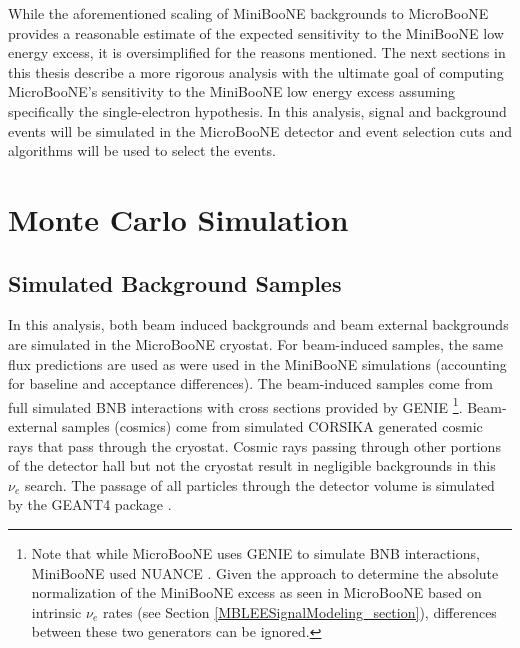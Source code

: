 While the aforementioned scaling of MiniBooNE backgrounds to MicroBooNE provides a reasonable estimate of the expected sensitivity to the MiniBooNE low energy excess, it is oversimplified for the reasons mentioned. The next sections in this thesis describe a more rigorous analysis with the ultimate goal of computing MicroBooNE's sensitivity to the MiniBooNE low energy excess assuming specifically the single-electron hypothesis. In this analysis, signal and background events will be simulated in the MicroBooNE detector and event selection cuts and algorithms will be used to select the events.














\section{Monte Carlo Simulation}

\subsection{Simulated Background Samples}\label{LEE_simulated_background_samples_section}
In this analysis, both beam induced backgrounds and beam external backgrounds are simulated in the MicroBooNE cryostat. For beam-induced samples, the same flux predictions are used as were used in the MiniBooNE simulations (accounting for baseline and acceptance differences). The beam-induced samples come from full simulated BNB interactions with cross sections provided by GENIE \cite{GENIEsource}\footnote{Note that while MicroBooNE uses GENIE to simulate BNB interactions, MiniBooNE used NUANCE \cite{NUANCEsource}. Given the approach to determine the absolute normalization of the MiniBooNE excess as seen in MicroBooNE based on intrinsic $\nu_e$ rates (see Section \ref{MBLEESignalModeling_section}), differences between these two generators can be ignored.}. Beam-external samples (cosmics) come from simulated CORSIKA generated \cite{CORSIKAsource} cosmic rays that pass through the cryostat. Cosmic rays passing through other portions of the detector hall but not the cryostat result in negligible backgrounds in this $\nu_e$ search. The passage of all particles through the detector volume is simulated by the {\sc GEANT4} package \cite{GEANT4source}. 

